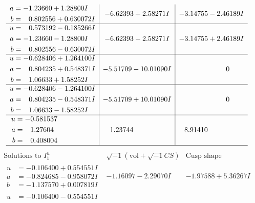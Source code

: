 \documentclass[1p]{elsarticle_modified}
\theoremstyle{definition}
\newcommand{\I}{\sqrt{-1}}
\begin{document}
$$\begin{array}{c|c|c}
\begin{aligned}
a &= -1.23660 + 1.28800 I \\
b &= \phantom{-}0.802556 + 0.630072 I\end{aligned}
 & -6.62393 + 2.58271 I & -3.14755 - 2.46189 I \\ \hline\begin{aligned}
u &= \phantom{-}0.573192 - 0.185266 I \\
a &= -1.23660 - 1.28800 I \\
b &= \phantom{-}0.802556 - 0.630072 I\end{aligned}
 & -6.62393 - 2.58271 I & -3.14755 + 2.46189 I \\ \hline\begin{aligned}
u &= -0.628406 + 1.264100 I \\
a &= \phantom{-}0.804235 + 0.548371 I \\
b &= \phantom{-}1.06633 + 1.58252 I\end{aligned}
 & -5.51709 - 10.01090 I & \phantom{-0.000000 } 0 \\ \hline\begin{aligned}
u &= -0.628406 - 1.264100 I \\
a &= \phantom{-}0.804235 - 0.548371 I \\
b &= \phantom{-}1.06633 - 1.58252 I\end{aligned}
 & -5.51709 + 10.01090 I & \phantom{-0.000000 } 0 \\ \hline\begin{aligned}
u &= -0.581537\phantom{ +0.000000I} \\
a &= \phantom{-}1.27604\phantom{ +0.000000I} \\
b &= \phantom{-}0.408004\phantom{ +0.000000I}\end{aligned}
 & \phantom{-}1.23744\phantom{ +0.000000I} & \phantom{-}8.91410\phantom{ +0.000000I}\\
 \hline 
 \end{array}$$\newpage$$\begin{array}{c|c|c}  
\text{Solutions to }I^u_{1}& \I (\text{vol} + \sqrt{-1}CS) & \text{Cusp shape}\\
 \hline 
\begin{aligned}
u &= -0.106400 + 0.554551 I \\
a &= -0.824685 - 0.958072 I \\
b &= -1.137570 + 0.007819 I\end{aligned}
 & -1.16097 - 2.29070 I & -1.97588 + 5.36267 I \\ \hline\begin{aligned}
u &= -0.106400 - 0.554551 I \\

\end{aligned}
\end{array}$$
\end{document}
